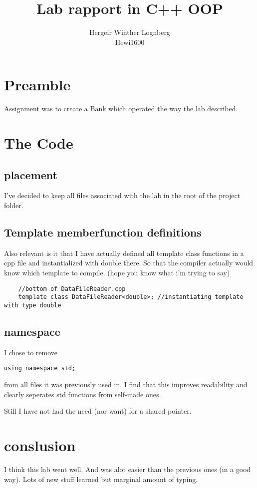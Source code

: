 \documentclass[11pt]{article}
\title{\textbf{Lab rapport in C++ OOP}}
\author{Hergeir Winther Lognberg \\
Hewi1600}
\date{}
\begin{document}
\maketitle

\section{Preamble}

Assignment was to create a Bank which operated the way the lab described.

\section{The Code}
\subsection{placement}
I've decided to keep all files associated with the lab in the root of the project folder.
\subsection{Template memberfunction definitions}
Also relevant is it that I have actually defined all template class functions in a cpp file and instantialized with double there. So that the compiler actually would know which template to compile. (hope you know what i'm trying to say)

\begin{lstlisting}
	//bottom of DataFileReader.cpp
	template class DataFileReader<double>; //instantiating template with type double
\end{lstlisting}

\subsection{namespace}
I chose to remove
\begin{lstlisting}
using namespace std;
\end{lstlisting}
from all files it was previously used in. I find that this improves readability and clearly seperates std functions from self-made ones.


Still I have not had the need (nor want) for a shared pointer. 

\section{conslusion}
I think this lab went well. And was alot easier than the previous ones (in a good way). Lots of new stuff learned but marginal amount of typing.
\end{document}
